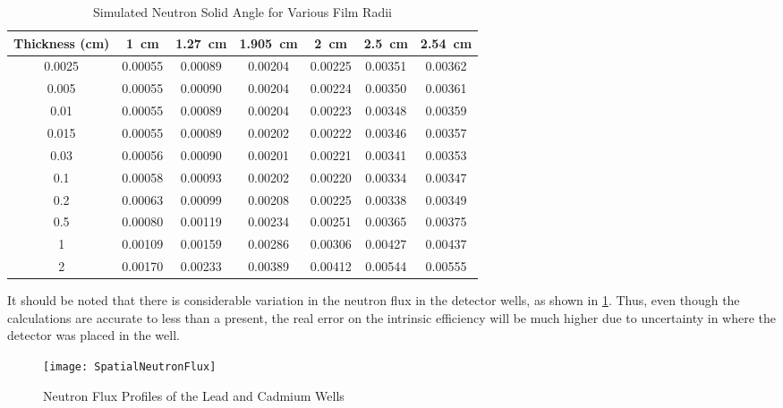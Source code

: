 \documentclass[draftcls,onecolumn]{IEEEtran}
\begin{document}
\begin{table}
	\centering
	\caption{Simulated Neutron Solid Angle for Various Film Radii}
	\label{tab:NeutronSolidAngle}
	\begin{tabular}{c | c c c c c c}
Thickness (\si{\cm})	&	\SI{1}{\cm}	&	\SI{1.27}{\cm}	&	\SI{1.905}{\cm}	&	\SI{2}{\cm}	&	\SI{2.5}{\cm}	&	\SI{2.54}{\cm} \\ \hline
0.0025	&	0.00055	&	0.00089	&	0.00204	&	0.00225	&	0.00351	&	0.00362	\\
0.005	&	0.00055	&	0.00090	&	0.00204	&	0.00224	&	0.00350	&	0.00361	\\
0.01	&	0.00055	&	0.00089	&	0.00204	&	0.00223	&	0.00348	&	0.00359	\\
0.015	&	0.00055	&	0.00089	&	0.00202	&	0.00222	&	0.00346	&	0.00357	\\
0.03	&	0.00056	&	0.00090	&	0.00201	&	0.00221	&	0.00341	&	0.00353	\\
0.1	&	0.00058	&	0.00093	&	0.00202	&	0.00220	&	0.00334	&	0.00347	\\
0.2	&	0.00063	&	0.00099	&	0.00208	&	0.00225	&	0.00338	&	0.00349	\\
0.5	&	0.00080	&	0.00119	&	0.00234	&	0.00251	&	0.00365	&	0.00375	\\
1	&	0.00109	&	0.00159	&	0.00286	&	0.00306	&	0.00427	&	0.00437	\\
2	&	0.00170	&	0.00233	&	0.00389	&	0.00412	&	0.00544	&	0.00555	\\
	\end{tabular}
\end{table}

It should be noted that there is considerable variation in the neutron flux in the detector wells, as shown in \ref{fig:NeutronFluxProfiles}.
Thus, even though the calculations are accurate to less than a present, the real error on the intrinsic efficiency will be much higher due to uncertainty in where the detector was placed in the well.
\begin{figure}
	\texttt{[image: SpatialNeutronFlux]}
  \caption{Neutron Flux Profiles of the Lead and Cadmium Wells}
  \label{fig:NeutronFluxProfiles}
\end{figure}
\end{document}
